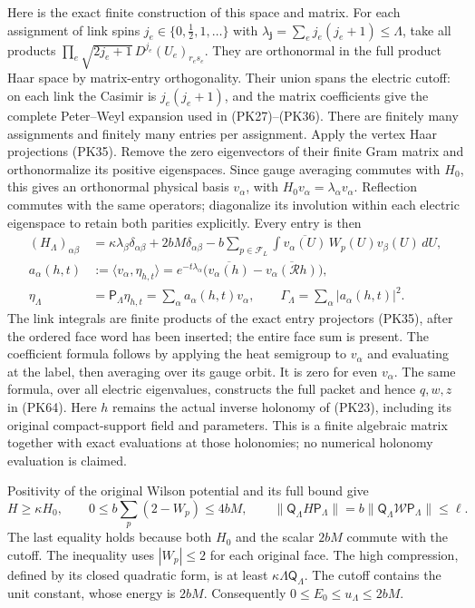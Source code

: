\documentclass[11pt]{article}
\begin{document}
Here is the exact finite construction of this space and matrix.
For each assignment of link spins \(j_e\in\{0,\tfrac12,1,\ldots\}\)
with \(\lambda_{\mathbf j}=\sum_ej_e(j_e+1)\le\Lambda\), take all
products \(\prod_e\sqrt{2j_e+1}\,D^{j_e}(U_e)_{r_es_e}\).
They are orthonormal in the full product Haar space by matrix-entry
orthogonality. Their union spans the electric cutoff: on each link the
Casimir is \(j_e(j_e+1)\), and the matrix coefficients give the complete
Peter–Weyl expansion used in (PK27)–(PK36).
There are finitely many assignments and finitely many entries per assignment.
Apply the vertex Haar projections (PK35). Remove the zero eigenvectors of
their finite Gram matrix and orthonormalize its positive eigenspaces.
Since gauge averaging commutes with \(H_0\), this gives an orthonormal
physical basis \(v_\alpha\), with
\(H_0v_\alpha=\lambda_\alpha v_\alpha\).
Reflection commutes with the same operators; diagonalize its involution
within each electric eigenspace to retain both parities explicitly.
Every entry is then
\[
 \begin{aligned}
 (H_\Lambda)_{\alpha\beta}
 &=\kappa\lambda_\beta\delta_{\alpha\beta}
      +2bM\delta_{\alpha\beta}
      -b\sum_{p\in\mathcal F_L}
       \int\overline{v_\alpha(U)}\,W_p(U)v_\beta(U)\,dU,\\
 a_\alpha(h,t)
 &:=\langle v_\alpha,\eta_{h,t}\rangle
   =e^{-t\lambda_\alpha}
       \bigl(\overline{v_\alpha(h)}
                    -\overline{v_\alpha(\mathcal Rh)}\bigr),\\
 \eta_\Lambda&=\mathsf P_\Lambda\eta_{h,t}
                      =\sum_\alpha a_\alpha(h,t)v_\alpha,\qquad
 \Gamma_\Lambda=\sum_\alpha|a_\alpha(h,t)|^2 .
 \end{aligned}\tag{PK66}
\]
The link integrals are finite products of the exact entry projectors
(PK35), after the ordered face word has been inserted; the entire face
sum is present. The coefficient formula follows by applying the heat
semigroup to \(v_\alpha\) and evaluating at the label, then averaging
over its gauge orbit. It is zero for even \(v_\alpha\). The same formula,
over all electric eigenvalues, constructs the full packet and hence
\(q,w,z\) in (PK64). Here \(h\) remains the actual inverse holonomy of
(PK23), including its original compact-support field and parameters.
This is a finite algebraic matrix together with exact evaluations at
those holonomies; no numerical holonomy evaluation is claimed.

Positivity of the original Wilson potential and its full bound give
\[
 H\ge\kappa H_0,\qquad
 0\le b\sum_p(2-W_p)\le4bM,\qquad
 \|\mathsf Q_\Lambda H\mathsf P_\Lambda\|
 =b\|\mathsf Q_\Lambda\mathcal W\mathsf P_\Lambda\|\le\ell .
 \tag{PK67}
\]
The last equality holds because both \(H_0\) and the scalar \(2bM\)
commute with the cutoff. The inequality uses \(|W_p|\le2\) for each
original face. The high compression, defined by its closed quadratic
form, is at least \(\kappa\Lambda\mathsf Q_\Lambda\).
The cutoff contains the unit constant, whose energy is \(2bM\).
Consequently \(0\le E_0\le u_\Lambda\le2bM\).
\end{document}
